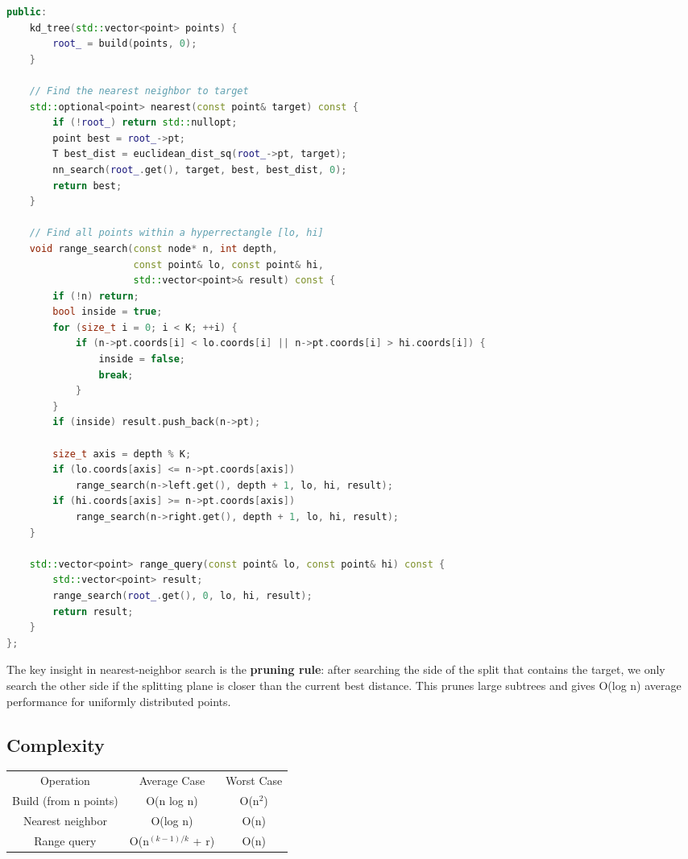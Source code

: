 \begin{lstlisting}[language=C++]
public:
    kd_tree(std::vector<point> points) {
        root_ = build(points, 0);
    }

    // Find the nearest neighbor to target
    std::optional<point> nearest(const point& target) const {
        if (!root_) return std::nullopt;
        point best = root_->pt;
        T best_dist = euclidean_dist_sq(root_->pt, target);
        nn_search(root_.get(), target, best, best_dist, 0);
        return best;
    }

    // Find all points within a hyperrectangle [lo, hi]
    void range_search(const node* n, int depth,
                      const point& lo, const point& hi,
                      std::vector<point>& result) const {
        if (!n) return;
        bool inside = true;
        for (size_t i = 0; i < K; ++i) {
            if (n->pt.coords[i] < lo.coords[i] || n->pt.coords[i] > hi.coords[i]) {
                inside = false;
                break;
            }
        }
        if (inside) result.push_back(n->pt);

        size_t axis = depth % K;
        if (lo.coords[axis] <= n->pt.coords[axis])
            range_search(n->left.get(), depth + 1, lo, hi, result);
        if (hi.coords[axis] >= n->pt.coords[axis])
            range_search(n->right.get(), depth + 1, lo, hi, result);
    }

    std::vector<point> range_query(const point& lo, const point& hi) const {
        std::vector<point> result;
        range_search(root_.get(), 0, lo, hi, result);
        return result;
    }
};
\end{lstlisting}

The key insight in nearest-neighbor search is the \textbf{pruning rule}: after searching the side of the split that contains the target, we only search the other side if the splitting plane is closer than the current best distance. This prunes large subtrees and gives O(log n) average performance for uniformly distributed points.

\subsection{Complexity}

\begin{center}
\begin{tabular}{ccc}
\toprule
Operation & Average Case & Worst Case \\
Build (from n points) & O(n log n) & O(n$^{2}$) \\
Nearest neighbor & O(log n) & O(n) \\
Range query & O(n$^{(k-1)/k}$ + r) & O(n) \\

\bottomrule
\end{tabular}
\end{center}

